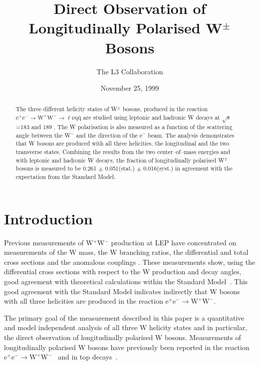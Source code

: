 \documentclass[12pt,a4paper,dvips]{article}
\date{November 25, 1999}
\begin{document}
%       
\begin{titlepage}

\title{Direct Observation of Longitudinally Polarised 
W$^{\pm}$ Bosons}
\author{The L3 Collaboration}
%
%
\begin{abstract}
\noindent
The three different helicity states of W$^{\pm}$ bosons, 
produced in the reaction 
$\mathrm{e}^{+}\mathrm{e}^{-} \rightarrow 
\mathrm{W}^{+}\mathrm{W}^{-} \rightarrow \mathrm{\ell \nu q \bar{q}}$ 
are studied using leptonic and hadronic W decays
at $\sqrt{s}$=183 \GeV{} and 189 \GeV{}. 
The W polarisation is also measured as a function of 
the scattering angle between the W$^{-}$ and the direction 
of the e$^{-}$ beam. The analysis demonstrates 
that W bosons are produced with all three helicities,  
the longitudinal and the two transverse states.
Combining the results from the two 
center--of--mass energies and with leptonic and hadronic W
decays, the fraction of longitudinally polarised W$^{\pm}$ bosons is
measured to be 0.261 $\pm$ 0.051(stat.) $\pm$ 0.016(syst.) in agreement 
with the expectation from the Standard Model.

\end{abstract}
%
%
\submitted

\end{titlepage}

\section*{Introduction}

Previous measurements of W$^{+}$W$^{-}$ production at LEP 
have concentrated on measurements of the W mass, the W branching ratios, 
the differential and total cross sections and 
the anomalous couplings \cite{wwl31,
wwaleph1,wwopal3}. 
These measurements show, using the
differential cross sections with respect 
to the W production and decay angles, 
good agreement with theoretical calculations within  
the Standard Model~\cite{standard_model,
Veltman:1968ki}. 
This good agreement with the Standard Model indicates indirectly that 
W bosons with all three helicities are produced in the 
reaction $\mathrm{e^{+}e^{-} \rightarrow W^{+}W^{-}}$. 

The primary goal of the measurement described in this paper is
a quantitative and model independent analysis 
of all three W helicity states and in particular, the 
direct observation of longitudinally polarised W bosons.
Measurements of longitudinally polarised W bosons
have previously been reported in the reaction 
$\mathrm{e^{+}e^{-} \rightarrow W^{+}W^{-}}$~\cite{wwopal3} and
in top decays~\cite{CDF_Wlong}.
 
\end{document}
